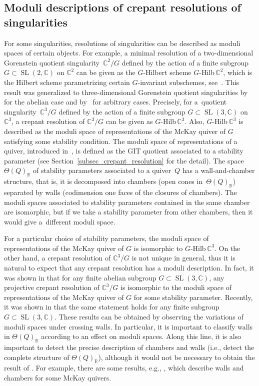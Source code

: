 \documentclass[pdftex]{sigma}
\numberwithin{equation}{section}
\theoremstyle{definition}
\newcommand{\RR}{\mathbb{R}}
\newcommand{\CC}{\mathbb{C}}
\newcommand{\SL}{\operatorname{SL}}
\begin{document}
\subsection{Moduli descriptions of crepant resolutions of singularities}\label{subsec_intro_moduli}

For some singularities, resolutions of singularities can be described as moduli spaces of certain objects.
For example, a minimal resolution of a two-dimensional Gorenstein quotient singularity~$\CC^2/G$ defined by the action of a finite subgroup
$G\subset\SL(2,\CC)$ on $\CC^2$ can be given as the $G$-Hilbert scheme {\rm $G$-Hilb\,$\CC^2$},
which is the Hilbert scheme parametrizing certain $G$-invariant subschemes, see~\cite{ito_nakamura_GHilb}.
This result was generalized to three-dimensional Gorenstein quotient singularities by~\cite{Nak_GHilb} for the abelian case and by~\cite{BKR} for arbitrary cases.
Precisely, for a~quotient singularity~$\CC^3/G$ defined by the action of a finite subgroup $G\subset\SL(3,\CC)$ on $\CC^3$,
a crepant resolution of $\CC^3/G$ can be given as {\rm $G$-Hilb\,$\CC^3$}.
Also, {\rm $G$-Hilb\,$\CC^3$} is described as the moduli space of representations of the McKay quiver of $G$ satisfying some stability condition.
The moduli space of representations of a quiver, introduced in~\cite{King_moduli}, is defined as the GIT quotient associated to a stability parameter
(see Section~\ref{subsec_crepant_resolution} for the detail).
The space $\Theta(Q)_\RR$ of stability parameters associated to a quiver~$Q$ has a wall-and-chamber structure,
that is, it is decomposed into chambers (open cones in~$\Theta(Q)_\RR$) separated by walls (codimension one faces of the closures of chambers).
The moduli spaces associated to stability parameters contained in the same chamber are isomorphic, but if we take a stability parameter from
other chambers, then it would give a~different moduli space.

For a particular choice of stability parameters, the moduli space of representations of the McKay quiver of $G$ is
isomorphic to {\rm $G$-Hilb\,$\CC^3$}.
On the other hand, a crepant resolution of $\CC^3/G$ is not unique in general, thus it is natural to expect that
any crepant resolution has a moduli description.
In fact, it was shown in \cite{CrawIshii} that for any finite abelian subgroup $G\subset\SL(3,\CC)$,
any projective crepant resolution of $\CC^3/G$ is isomorphic to the moduli space of representations of the McKay quiver of $G$ for some stability parameter.
Recently, it was shown in \cite{Yamagishi_CIconj} that the same statement holds for any finite subgroup $G\subset\SL(3,\CC)$.
These results can be obtained by observing the variations of moduli spaces under crossing walls.
In particular, it is important to classify walls in $\Theta(Q)_\RR$ according to an effect on moduli spaces.
Along this line, it is also important to detect the precise description of chambers and walls (i.e., detect the complete structure of $\Theta(Q)_\RR$),
although it would not be necessary to obtain the result of \cite{CrawIshii,Yamagishi_CIconj}.
For example, there are some results, e.g., \cite{craw_thesis,MT_stability,NS_flops,worm_GHilb}, which describe walls and chambers for some McKay quivers.
\end{document}

